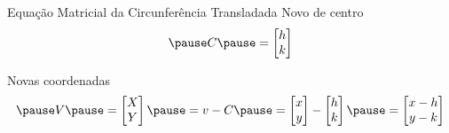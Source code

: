 \documentclass[fleqn,aspectratio=169,12pt]{beamer}
\begin{document}
\begin{proofframe}{Equação Matricial da Circunferência Transladada}
  Novo de centro
  \[
    \pause
    C
    \pause
    = \begin{bmatrix}
      h \\
      k
    \end{bmatrix}
  \]

  \pause
  \bigskip
  Novas coordenadas
  \[
    \pause
    V
    \pause
    = \begin{bmatrix}
      X \\
      Y
    \end{bmatrix}
    \pause
    = v - C
    \pause
    = \begin{bmatrix}
      x \\
      y
    \end{bmatrix}
    -
    \begin{bmatrix}
      h \\
      k
    \end{bmatrix}
    \pause
    = \begin{bmatrix}
      x - h \\
      y - k
    \end{bmatrix}
  \]
\end{proofframe}
\end{document}
